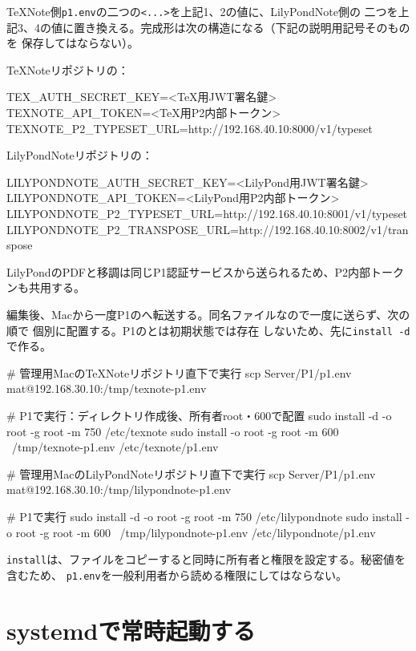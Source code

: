 \documentclass[uplatex,a4paper,11pt]{jsarticle}
\begin{document}
TeXNote側\texttt{p1.env}の二つの\texttt{<...>}を上記1、2の値に、LilyPondNote側の
二つを上記3、4の値に置き換える。完成形は次の構造になる（下記の説明用記号そのものを
保存してはならない）。

TeXNoteリポジトリの：

\begin{command}
TEX_AUTH_SECRET_KEY=<TeX用JWT署名鍵>
TEXNOTE_API_TOKEN=<TeX用P2内部トークン>
TEXNOTE_P2_TYPESET_URL=http://192.168.40.10:8000/v1/typeset
\end{command}

LilyPondNoteリポジトリの：

\begin{command}
LILYPONDNOTE_AUTH_SECRET_KEY=<LilyPond用JWT署名鍵>
LILYPONDNOTE_API_TOKEN=<LilyPond用P2内部トークン>
LILYPONDNOTE_P2_TYPESET_URL=http://192.168.40.10:8001/v1/typeset
LILYPONDNOTE_P2_TRANSPOSE_URL=http://192.168.40.10:8002/v1/transpose
\end{command}

LilyPondのPDFと移調は同じP1認証サービスから送られるため、P2内部トークンも共用する。

編集後、Macから一度P1のへ転送する。同名ファイルなので一度に送らず、次の順で
個別に配置する。P1のとは初期状態では存在
しないため、先に\texttt{install -d}で作る。

\begin{command}
# 管理用MacのTeXNoteリポジトリ直下で実行
scp Server/P1/p1.env mat@192.168.30.10:/tmp/texnote-p1.env

# P1で実行：ディレクトリ作成後、所有者root・600で配置
sudo install -d -o root -g root -m 750 /etc/texnote
sudo install -o root -g root -m 600 \
  /tmp/texnote-p1.env /etc/texnote/p1.env

# 管理用MacのLilyPondNoteリポジトリ直下で実行
scp Server/P1/p1.env mat@192.168.30.10:/tmp/lilypondnote-p1.env

# P1で実行
sudo install -d -o root -g root -m 750 /etc/lilypondnote
sudo install -o root -g root -m 600 \
  /tmp/lilypondnote-p1.env /etc/lilypondnote/p1.env
\end{command}

\texttt{install}は、ファイルをコピーすると同時に所有者と権限を設定する。秘密値を含むため、
\texttt{p1.env}を一般利用者から読める権限にしてはならない。

\section{systemdで常時起動する}
\end{document}
